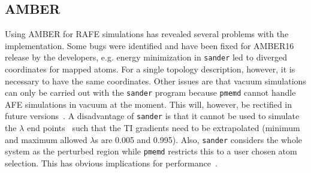 \documentclass[journal=jctcce,manuscript=article]{achemso}
\newcommand{\progname}[1]{\texttt{#1}}
\begin{document}


\subsection{AMBER}
\label{sec:amber-results}

Using AMBER for RAFE simulations has revealed several problems with
the implementation.  Some bugs were identified and have been fixed for AMBER16 
release by the developers, e.g. energy minimization in \progname{sander} led to 
diverged coordinates for mapped atoms.  For a single topology description, 
however, it is necessary to have the same coordinates.  Other issues are that 
vacuum simulations can only be carried out with the \progname{sander} program 
because \progname{pmemd} cannot handle AFE simulations in vacuum at the 
moment.  This will, however, be rectified in future 
versions~\cite{doi:10.1021/acs.jctc.7b00102}.  A disadvantage of 
\progname{sander} is that it cannot be used to simulate the $\lambda$ end 
points~\cite{doi:10.1021/ct400340s} such that the TI gradients need to be 
extrapolated (minimum and maximum allowed $\lambda$s are 0.005 and 0.995). 
 Also, \progname{sander} considers the whole system as the perturbed
region while \progname{pmemd} restricts this to a user chosen atom selection.  This
has obvious implications for performance~\cite{doi:10.1021/ct400340s}.
\end{document}
